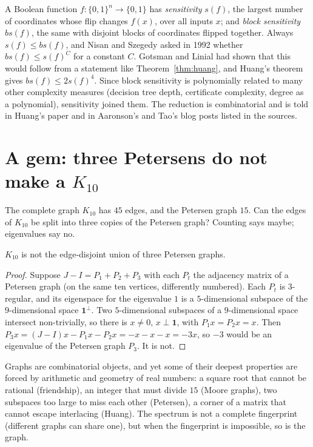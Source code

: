 \begin{remark}
A Boolean function $f:\{0,1\}^n\to\{0,1\}$ has \emph{sensitivity} $s(f)$, the largest number of coordinates whose flip changes
$f(x)$, over all inputs $x$; and \emph{block sensitivity} $bs(f)$, the same with disjoint blocks of coordinates flipped together.
Always $s(f)\le bs(f)$, and Nisan and Szegedy asked in 1992 whether $bs(f)\le s(f)^C$ for a constant $C$. Gotsman and Linial had
shown that this would follow from a statement like Theorem~\ref{thm:huang}, and Huang's theorem gives $bs(f)\le2s(f)^4$. Since block
sensitivity is polynomially related to many other complexity measures (decision tree depth, certificate complexity, degree as a
polynomial), sensitivity joined them. The reduction is combinatorial and is told in Huang's paper and in Aaronson's and Tao's blog
posts listed in the sources.
\end{remark}

\section{A gem: three Petersens do not make a $K_{10}$}

The complete graph $K_{10}$ has $45$ edges, and the Petersen graph $15$. Can the edges of $K_{10}$ be split into three copies of the
Petersen graph? Counting says maybe; eigenvalues say no.

\begin{proposition}[Schwenk]\label{prop:schwenk}
$K_{10}$ is not the edge-disjoint union of three Petersen graphs.
\end{proposition}
\begin{proof}
Suppose $J-I=P_1+P_2+P_3$ with each $P_t$ the adjacency matrix of a Petersen graph (on the same ten vertices, differently numbered).
Each $P_t$ is $3$-regular, and its eigenspace for the eigenvalue $1$ is a $5$-dimensional subspace of the $9$-dimensional space $\mathbf
1^\perp$. Two $5$-dimensional subspaces of a $9$-dimensional space intersect non-trivially, so there is $x\ne0$, $x\perp\mathbf 1$,
with $P_1x=P_2x=x$. Then $P_3x=(J-I)x-P_1x-P_2x=-x-x-x=-3x$, so $-3$ would be an eigenvalue of the Petersen graph $P_3$. It is not.
\end{proof}

\begin{beauty}
Graphs are combinatorial objects, and yet some of their deepest properties are forced by arithmetic and geometry of real numbers:
a square root that cannot be rational (friendship), an integer that must divide $15$ (Moore graphs), two subspaces too large to
miss each other (Petersen), a corner of a matrix that cannot escape interlacing (Huang). The spectrum is not a complete
fingerprint (different graphs can share one), but when the fingerprint is impossible, so is the graph.
\end{beauty}

